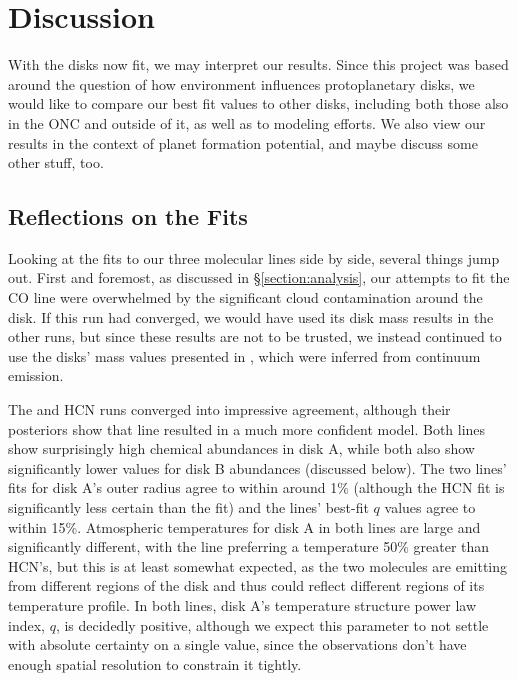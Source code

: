 \chapter{Discussion}
\label{chap:discussion}

With the disks now fit, we may interpret our results. Since this project was based around the question of how environment influences protoplanetary disks, we would like to compare our best fit values to other disks, including both those also in the ONC \citep{Factor2017} and outside of it, as well as to modeling efforts. We also view our results in the context of planet formation potential, and maybe discuss some other stuff, too.


\section{Reflections on the Fits}

Looking at the fits to our three molecular lines side by side, several things jump out. First and foremost, as discussed in \S\ref{section:analysis}, our attempts to fit the CO line were overwhelmed by the significant cloud contamination around the disk. If this run had converged, we would have used its disk mass results in the other runs, but since these results are not to be trusted, we instead continued to use the disks' mass values presented in \citet{Williams2014}, which were inferred from continuum emission.


The \hco and HCN runs converged into impressive agreement, although their posteriors show that \hco line resulted in a much more confident model. Both lines show surprisingly high chemical abundances in disk A, while both also show significantly lower values for disk B abundances (discussed below). The two lines' fits for disk A's outer radius agree to within around 1\% (although the HCN fit is significantly less certain than the \hco fit) and the lines' best-fit $q$ values agree to within 15\%. Atmospheric temperatures for disk A in both lines are large and significantly different, with the \hco line preferring a temperature 50\% greater than HCN's, but this is at least somewhat expected, as the two molecules are emitting from different regions of the disk and thus could reflect different regions of its temperature profile. In both lines, disk A's temperature structure power law index, $q$, is decidedly positive, although we expect this parameter to not settle with absolute certainty on a single value, since the observations don't have enough spatial resolution to constrain it tightly.

